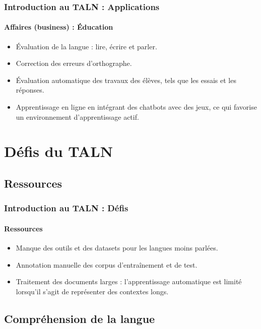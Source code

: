 \documentclass[xcolor=table]{beamer}
\begin{document}
\begin{frame}
\frametitle{Introduction au TALN : Applications}
\framesubtitle{Affaires (business) : Éducation}

\begin{itemize}
	\item Évaluation de la langue : lire, écrire et parler.
	\item Correction des erreurs d'orthographe.
	\item Évaluation automatique des travaux des élèves, tels que les essais et les réponses.
	\item Apprentissage en ligne en intégrant des chatbots avec des jeux, ce qui favorise un environnement d'apprentissage actif.
\end{itemize}

\end{frame}

\section{Défis du TALN}

%

\subsection{Ressources}

\begin{frame}
\frametitle{Introduction au TALN : Défis}
\framesubtitle{Ressources}

\begin{itemize}
	\item Manque des outils et des datasets pour les langues moins parlées.
	\item Annotation manuelle des corpus d'entraînement et de test.
	\item Traitement des documents larges : l'apprentissage automatique est limité lorsqu'il s'agit de représenter des contextes longs.
\end{itemize}
\end{frame}

\subsection{Compréhension de la langue}
\end{document}
